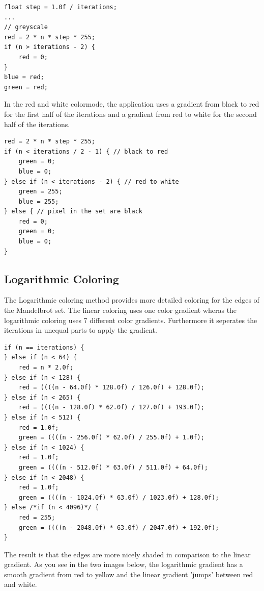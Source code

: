 \documentclass[final, paper=a4, paper=portrait, pagesize=auto, fontsize=10pt,english]{scrartcl}
\begin{document}
\begin{lstlisting}
float step = 1.0f / iterations;
...
// greyscale
red = 2 * n * step * 255;
if (n > iterations - 2) {
	red = 0;
}
blue = red;
green = red;
\end{lstlisting}

In the red and white colormode, the application uses a gradient from black to red for the first half of the iterations and a gradient from red to white for the second half of the iterations.
\begin{lstlisting}
red = 2 * n * step * 255;
if (n < iterations / 2 - 1) { // black to red
	green = 0;
	blue = 0;
} else if (n < iterations - 2) { // red to white
	green = 255;
	blue = 255;
} else { // pixel in the set are black
	red = 0;
	green = 0;
	blue = 0;
}
\end{lstlisting}

\subsection{Logarithmic Coloring} 

The Logarithmic coloring method provides more detailed coloring for the edges of the Mandelbrot set. The linear coloring uses one color gradient wheras the logarithmic coloring uses 7 different color gradients. Furthermore it seperates the iterations in unequal parts to apply the gradient.

\begin{lstlisting}
if (n == iterations) {
} else if (n < 64) {
	red = n * 2.0f;
} else if (n < 128) {
	red = ((((n - 64.0f) * 128.0f) / 126.0f) + 128.0f);
} else if (n < 265) {
	red = ((((n - 128.0f) * 62.0f) / 127.0f) + 193.0f);
} else if (n < 512) {
	red = 1.0f;
	green = ((((n - 256.0f) * 62.0f) / 255.0f) + 1.0f);
} else if (n < 1024) {
	red = 1.0f;
	green = ((((n - 512.0f) * 63.0f) / 511.0f) + 64.0f);
} else if (n < 2048) {
	red = 1.0f;
	green = ((((n - 1024.0f) * 63.0f) / 1023.0f) + 128.0f);
} else /*if (n < 4096)*/ {
	red = 255;
	green = ((((n - 2048.0f) * 63.0f) / 2047.0f) + 192.0f);
}
\end{lstlisting}

The result is that the edges are more nicely shaded in comparison to the linear gradient. As you see in the two images below, the logarithmic gradient has a smooth gradient from red to yellow and the linear gradient 'jumps' between red and white. \\\\
\end{document}
